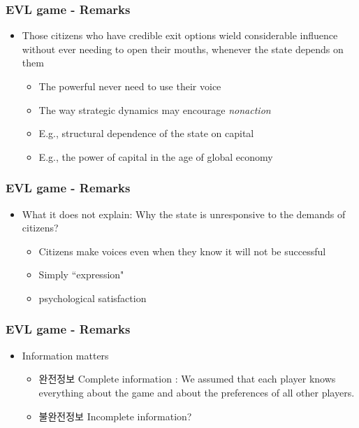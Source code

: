 \documentclass[xcolor=pdftex,dvipsnames]{beamer}
\begin{document}
\begin{frame}
\frametitle{EVL game - Remarks}
\begin{itemize}
\item Those citizens who have credible exit options wield considerable influence without ever needing to open their mouths, whenever the state depends on them
\begin{itemize}
\item The powerful never need to use their voice
\item The way strategic dynamics may encourage \emph{nonaction}
\item E.g., structural dependence of the state on capital
\item E.g., the power of capital in the age of global economy
\end{itemize}
\end{itemize}
\end{frame}

\begin{frame}
\frametitle{EVL game - Remarks}
\begin{itemize}
\item What it does not explain: Why the state is unresponsive to the demands of citizens?
\begin{itemize}
\item Citizens make voices even when they know it will not be successful
\item Simply ``expression" 
\item psychological satisfaction
\end{itemize}
\end{itemize}
\end{frame}

\begin{frame}
\frametitle{EVL game - Remarks}
\begin{itemize}
\item Information matters
\begin{itemize}
\item 완전정보 Complete information : We assumed that each player knows everything about the game and about the preferences of all other players.
\item 불완전정보 Incomplete information?
\end{itemize}
\end{itemize}
\end{frame}

\end{document}
